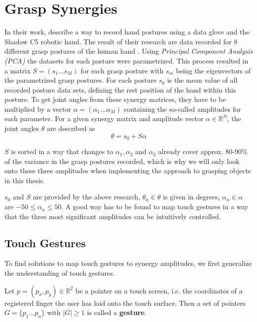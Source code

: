 \section{Grasp Synergies}

In their work, \citeauthor{Bernardino2013} describe a way to record hand postures using a data glove and the Shadow C5 robotic hand. The result of their research are data recorded for 8 different grasp postures of the human hand \cite{Bernardino2013}. Using \textit{Principal Component Analysis (PCA)} the datasets for each posture were parametrized. This process resulted in a matrix $S = (s_1 \dots s_M)$ for each grasp posture with $s_m$ being the eigenvectors of the parametrized grasp postures. For each posture $s_0$ is the mean value of all recorded posture data sets, defining the rest position of the hand within this posture. To get joint angles from these synergy matrices, they have to be multiplied by a vector $\alpha = (\alpha_1 \dots \alpha_M)$ containing the so-called amplitudes for each parameter. For a given synergy matrix and amplitude vector $\alpha \in \mathbb{R}^N$, the joint angles $\theta$ are described as
\begin{equation}
\label{eq:syn}
\theta = s_0 + S\alpha
\end{equation}

$S$ is sorted in a way that changes to $\alpha_1, \alpha_2$ and $\alpha_3$ already cover approx. 80-90\% of the variance in the grasp postures recorded, which is why we will only look onto these three amplitudes when implementing the approach to grasping objects in this thesis.

$s_0$ and $S$ are provided by the above research, $\theta_n \in \theta$ is given in degrees, $\alpha_n \in \alpha$ are $-50 \leq \alpha_n \leq 50$. A good way has to be found to map touch gestures in a way that the three most significant amplitudes can be intuitively controlled. 

\subsection{Touch Gestures}

To find solutions to map touch gestures to synergy amplitudes, we first generalize the understanding of touch gestures.

\begin{defn}
Let $p = (p_x, p_y) \in \mathbb{R}^2$ be a pointer on a touch screen, i.e. the coordinates of a registered finger the user has laid onto the touch surface. Then a set of pointers $G = \{p_1\dots p_n\}$ with $|G| \geq 1$ is called a \textbf{gesture}.
\end{defn}


